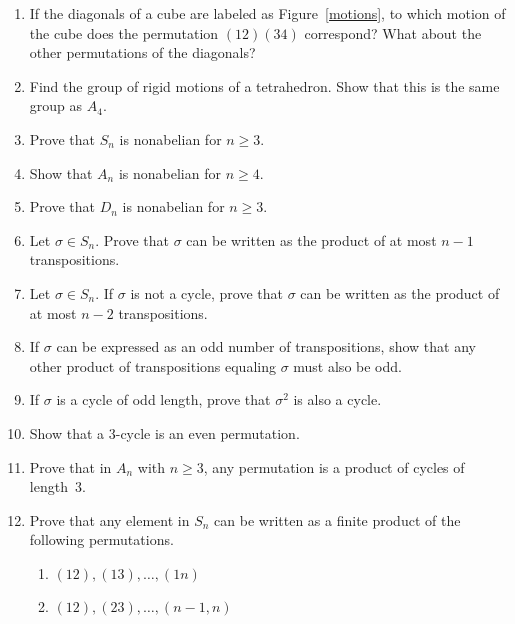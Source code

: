 {\begin{enumerate}
 
\bf \item \rm
If the diagonals of a cube are labeled as Figure~\ref{motions}, to
which motion of the cube does the permutation $(12)(34)$ correspond?
What about the other permutations of the diagonals?
 
 
\bf \item \rm
Find the group of rigid motions of a tetrahedron.  Show that this is
the same group as $A_4$. 
 
 
 
 
\bf \item \rm
Prove that $S_n$ is nonabelian for $n \geq 3$.
 
 
\bf \item \rm
Show that $A_n$ is nonabelian for $n \geq 4$.
 
 
\bf \item \rm
Prove that $D_n$ is nonabelian for $n \geq 3$.
 
 
\bf \item \rm
Let $\sigma \in S_n$. Prove that $\sigma$ can be written as the
product of at most $n-1$ transpositions. 
 
 
\bf \item \rm
Let $\sigma \in S_n$. If $\sigma$ is not a cycle, prove that $\sigma$
can be written as the product of at most $n-2$ transpositions.
 
 
\bf \item \rm
If $\sigma$ can be expressed as an odd number of transpositions, show
that any other product of transpositions equaling $\sigma$ must also
be odd. 
 
 
\bf \item \rm
If $\sigma$ is a cycle of odd length, prove that $\sigma^2$ is also a
cycle. 
 
 
\bf \item \rm
Show that a 3-cycle is an even permutation.
 
 
\bf \item \rm
Prove that in $A_n$ with $n \geq 3$, any permutation is a product of
cycles of length~3.  
 
 
\bf \item \rm
Prove that any element in $S_n$ can be written as a finite product of
the following permutations.
\begin{enumerate}
 
 \bf \item \rm
$(1 2), (13), \ldots, (1n)$
 
 \bf \item \rm
$(1 2), (23), \ldots, (n- 1,n)$
 

\end{enumerate}
\end{enumerate}}
